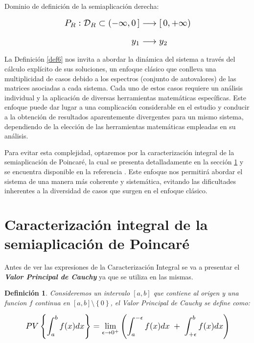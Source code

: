 \documentclass[12pt,a4paper]{report} %
\newtheorem{definicion}{Definición}[chapter] %
\begin{document}
	\vspace{0.5cm}Dominio de definición de la semiaplicación derecha:
	
	\vspace{0.5cm}
	
	\begin{equation}
		\label{eq:dr}
		\scalebox{1.3}{$\displaystyle
			\begin{aligned}
				P_R:\mathcal{D}_R\subset (-\infty,0\,] &\longrightarrow [\,0, +\infty)\\[2mm]
				y_1 &\longrightarrow y_2
			\end{aligned}
			$}
	\end{equation}
	
	\vspace{0.5cm}La Definición \ref{def6} nos invita a abordar la dinámica del sistema a través del cálculo explícito de sus soluciones, un enfoque clásico que conlleva una multiplicidad de casos debido a los espectros (conjunto de autovalores) de las matrices asociadas a cada sistema. Cada uno de estos casos requiere un análisis individual y la aplicación de diversas herramientas matemáticas específicas. Este enfoque puede dar lugar a una complicación considerable en el estudio y conducir a la obtención de resultados aparentemente divergentes para un mismo sistema, dependiendo de la elección de las herramientas matemáticas empleadas en su análisis.
	
	\vspace{0.5cm}\noindent Para evitar esta complejidad, optaremos por la caracterización integral de la semiaplicación de Poincaré, la cual se presenta detalladamente en la sección \ref{sec41} y se encuentra disponible en la referencia \cite{caracterizacion}. Este enfoque nos permitirá abordar el sistema de una manera más coherente y sistemática, evitando las dificultades inherentes a la diversidad de casos que surgen en el enfoque clásico.
	\newpage
	
	\section{Caracterización integral de la semiaplicación de Poincaré}
	\label{sec41}
	
	\vspace{0.5cm} Antes de ver las expresiones de la Caracterización Integral se va a presentar el \textit{\textbf{Valor Principal de Cauchy}} ya que se utiliza en las mismas.
	\begin{definicion}
	
	 Consideremos un intervalo $[a,b]$ que contiene al origen y una funcion $f$ continua en $[a,b] \setminus \left\{0\right\}$, el Valor Principal de Cauchy se define como:
	
	\begin{equation}
		\scalebox{1.2}{$\displaystyle
			PV\left\{\int_{a}^{b}f(x)dx\right\}= \lim_{\epsilon \to 0^+}\left(
			\int_{a}^{-\epsilon}f(x)dx \; + \; 
			\int_{+\epsilon}^{b}f(x)dx
			\right)
			$}
	\end{equation}\smallskip
	
    \end{definicion}
    
\end{document}
